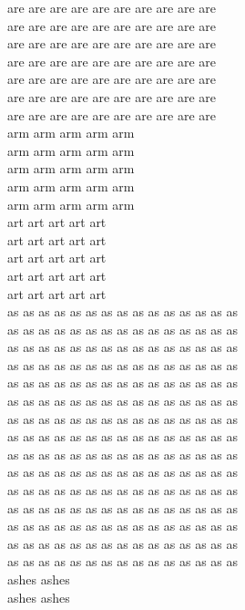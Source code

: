 are are are are are are are are are are\\
are are are are are are are are are are\\
are are are are are are are are are are\\
are are are are are are are are are are\\
are are are are are are are are are are\\
are are are are are are are are are are\\
are are are are are are are are are are\\
arm arm arm arm arm\\
arm arm arm arm arm\\
arm arm arm arm arm\\
arm arm arm arm arm\\
arm arm arm arm arm\\
art art art art art\\
art art art art art\\
art art art art art\\
art art art art art\\
art art art art art\\
as as as as as as as as as as as as as as as\\
as as as as as as as as as as as as as as as\\
as as as as as as as as as as as as as as as\\
as as as as as as as as as as as as as as as\\
as as as as as as as as as as as as as as as\\
as as as as as as as as as as as as as as as\\
as as as as as as as as as as as as as as as\\
as as as as as as as as as as as as as as as\\
as as as as as as as as as as as as as as as\\
as as as as as as as as as as as as as as as\\
as as as as as as as as as as as as as as as\\
as as as as as as as as as as as as as as as\\
as as as as as as as as as as as as as as as\\
as as as as as as as as as as as as as as as\\
as as as as as as as as as as as as as as as\\
ashes ashes\\
ashes ashes\\
